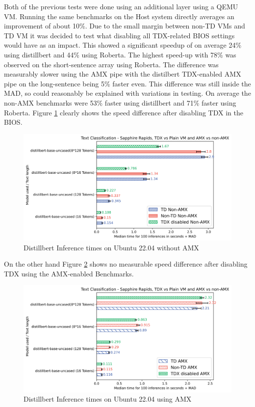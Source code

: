 Both of the previous tests were done using an additional layer using a QEMU VM. Running the same benchmarks on the Host system directly averages an improvement of about 10\%. 
Due to the small margin between non-TD VMs and TD VM it was decided to test what disabling all TDX-related BIOS settings would have as an impact. This showed a significant speedup of on average 24\% using distillbert and 44\% using Roberta. The highest speed-up with 78\% was observed on the short-sentence array using Roberta. The difference was measurably slower using the AMX pipe with the distilbert TDX-enabled AMX pipe on the long-sentence being 5\% faster even. This difference was still inside the MAD, so could reasonably be explained with variations in testing. On average the non-AMX benchmarks were 53\% faster using distillbert and 71\% faster using Roberta. Figure \ref{fig:distillbertMADNONAMX} clearly shows the speed difference after disabling TDX in the BIOS. 
\begin{figure}
   \centering
       \includegraphics[width=.95\textwidth]{figures/distillbertMAD.png} 
 \caption{Distillbert Inference times on Ubuntu 22.04 without AMX}
 \label{fig:distillbertMADNONAMX}
\end{figure}
On the other hand Figure \ref{fig:distillbertMADAMX} shows no measurable speed difference after disabling TDX using the AMX-enabled Benchmarks. 
\begin{figure}
   \centering
       \includegraphics[width=.95\textwidth]{figures/distillbertMADAMX.png} 
 \caption{Distillbert Inference times on Ubuntu 22.04 using AMX}
 \label{fig:distillbertMADAMX}
\end{figure}
